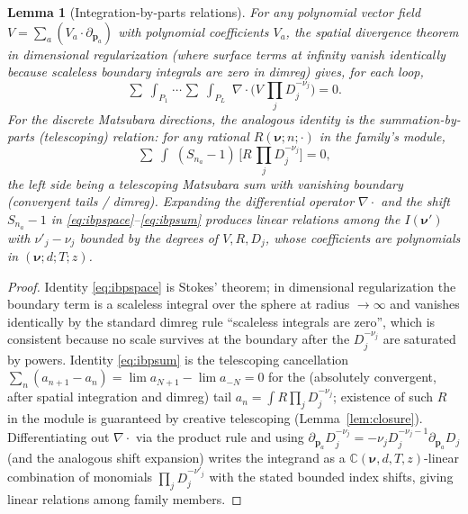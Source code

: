 \documentclass{amsart}
\newtheorem{lemma}{Lemma}
\theoremstyle{definition}
\begin{document}
\begin{lemma}[Integration-by-parts relations]\label{lem:ibp}
For any polynomial vector field $V=\sum_a (V_a\!\cdot\!\partial_{\mathbf p_a})$
with polynomial coefficients $V_a$, the spatial divergence theorem in
dimensional regularization (where surface terms at infinity vanish identically
because scaleless boundary integrals are zero in dimreg) gives, for each loop,
\begin{equation}\label{eq:ibpspace}
  \mathop{\textstyle\sum\!\!\!\!\!\!\int}_{P_1}\!\!\cdots
   \mathop{\textstyle\sum\!\!\!\!\!\!\int}_{P_L}
   \ \nabla\!\cdot\!\Big(V\,\textstyle\prod_j D_j^{-\nu_j}\Big)=0 .
\end{equation}
For the discrete Matsubara directions, the analogous identity is the
\emph{summation-by-parts (telescoping) relation}: for any rational
$R(\boldsymbol\nu;n;\cdot)$ in the family's module,
\begin{equation}\label{eq:ibpsum}
  \mathop{\textstyle\sum\!\!\!\!\!\!\int}\ (S_{n_a}-1)\,\big[R\,\textstyle\prod_j D_j^{-\nu_j}\big]=0,
\end{equation}
the left side being a telescoping Matsubara sum with vanishing boundary
(convergent tails / dimreg). Expanding the differential operator $\nabla\cdot$
and the shift $S_{n_a}-1$ in \eqref{eq:ibpspace}--\eqref{eq:ibpsum} produces
linear relations among the $I(\boldsymbol\nu')$ with
$\nu'_j-\nu_j$ bounded by the degrees of $V,R,D_j$, whose coefficients are
polynomials in $(\boldsymbol\nu;d;T;z)$.
\end{lemma}

\begin{proof}
Identity \eqref{eq:ibpspace} is Stokes' theorem; in dimensional regularization
the boundary term is a scaleless integral over the sphere at radius $\to\infty$
and vanishes identically by the standard dimreg rule ``scaleless integrals are
zero'', which is consistent because no scale survives at the boundary after the
$D_j^{-\nu_j}$ are saturated by powers. Identity \eqref{eq:ibpsum} is the
telescoping cancellation $\sum_n (a_{n+1}-a_n)=\lim a_{N+1}-\lim a_{-N}=0$ for
the (absolutely convergent, after spatial integration and dimreg) tail
$a_n=\mathop{\int}R\prod_j D_j^{-\nu_j}$; existence of such $R$ in the module
is guaranteed by creative telescoping (Lemma~\ref{lem:closure}). Differentiating
out $\nabla\cdot$ via the product rule and using
$\partial_{\mathbf p_a}D_j^{-\nu_j}=-\nu_j D_j^{-\nu_j-1}\partial_{\mathbf
p_a}D_j$ (and the analogous shift expansion) writes the integrand as a
$\mathbb C(\boldsymbol\nu,d,T,z)$-linear combination of monomials
$\prod_j D_j^{-\nu'_j}$ with the stated bounded index shifts, giving linear
relations among family members.
\end{proof}
\end{document}
